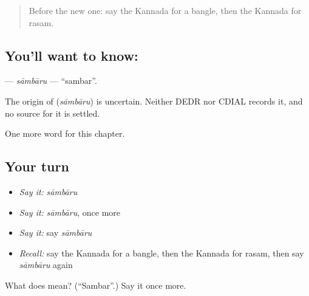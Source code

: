 \label{lesson:KA-C121-sambaru}



\begin{quote}
Before the new one: say the Kannada for a bangle, then the Kannada for rasam.
\end{quote}

\subsection*{You'll want to know: }
\textbf{} — \emph{sāmbāru} — \textquotedblleft{}sambar\textquotedblright{}.

\begin{cousinweb}
The origin of \textbf{} (\emph{sāmbāru}) is uncertain. Neither DEDR nor CDIAL records it, and no source for it is settled.
\end{cousinweb}

\begin{grammarlens}[title={What you've built}]
One more word for this chapter.
\end{grammarlens}

\subsection*{Your turn}
\begin{itemize}
\raggedright
  \item \emph{Say it:} \emph{sāmbāru}
  \item \emph{Say it:} \emph{sāmbāru}, once more
  \item \emph{Say it:} say \emph{sāmbāru}
  \item \emph{Recall:} say the Kannada for a bangle, then the Kannada for rasam, then say \emph{sāmbāru} again
\end{itemize}

\begin{tcolorbox}[breakable,colback=teal!4,colframe=teal!35!black,title={Before you move on}]
What does  mean? (\textquotedblleft{}Sambar\textquotedblright{}.) Say it once more.
\end{tcolorbox}
